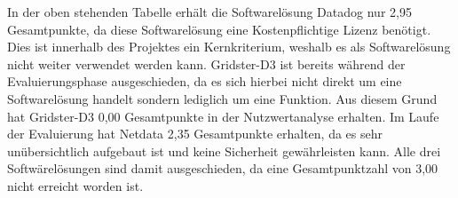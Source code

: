 \begin{table}[H]
\caption{Nutzwertanalyse Datadog, Gridster-D3 und Netdata}
\label{nwa_dgn}
\end{table}

In der oben stehenden Tabelle erhält die Softwarelösung Datadog nur 2,95
Gesamtpunkte, da diese Softwarelösung eine Kostenpflichtige Lizenz benötigt.
Dies ist innerhalb des Projektes ein Kernkriterium, weshalb es als
Softwarelösung nicht weiter verwendet werden kann. Gridster\hyp{}D3 ist bereits
während der Evaluierungsphase ausgeschieden, da es sich hierbei nicht direkt um
eine Softwarelösung handelt sondern lediglich um eine Funktion. Aus diesem
Grund hat Gridster\hyp{}D3 0,00 Gesamtpunkte in der Nutzwertanalyse erhalten.
Im Laufe der Evaluierung hat Netdata 2,35 Gesamtpunkte erhalten, da es sehr
unübersichtlich aufgebaut ist und keine Sicherheit gewährleisten kann. Alle
drei Softwärelösungen sind damit ausgeschieden, da eine Gesamtpunktzahl von
3,00 nicht erreicht worden ist.

